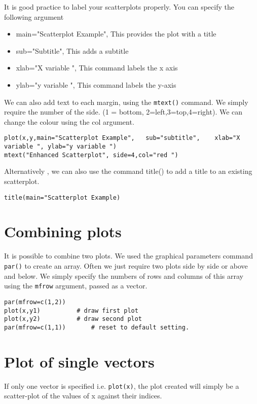 It is good practice to label your scatterplots properly. You can specify the following argument
\begin{itemize}
	\item	main="Scatterplot Example", 	This provides the plot with a title
	\item	sub="Subtitle",                 This adds a subtitle
	\item	xlab="X variable ",				This command labels the x axis 
	\item   ylab="y variable ",				This command labels the y-axis
\end{itemize}
We can also add text to each margin, using the \texttt{mtext()} command.  
We simply require the number of the side. (1 = bottom, 2=left,3=top,4=right). 
We can change the colour using the col argument.
\footnotesize \begin{verbatim}
plot(x,y,main="Scatterplot Example",   sub="subtitle",    xlab="X variable ", ylab="y variable ")	
mtext("Enhanced Scatterplot", side=4,col="red ")
\end{verbatim}\normalsize
Alternatively , we can also use the command title() to add a title to an existing scatterplot.
\footnotesize \begin{verbatim}
title(main="Scatterplot Example)	
\end{verbatim}\normalsize


\section{Combining plots}
It is possible to combine two plots. We used the graphical parameters command \texttt{par()} to create an array. 
Often we just require two plots side by side or above and below. We simply specify the numbers of rows and columns of this array using the \texttt{mfrow} argument, passed as a vector.

\begin{verbatim}
par(mfrow=c(1,2))
plot(x,y1)			# draw first plot
plot(x,y2)			# draw second plot
par(mfrow=c(1,1))		# reset to default setting.
\end{verbatim}

\section{Plot of single vectors}
If only one vector is specified i.e. \texttt{plot(x)},  the plot created will simply be a scatter-plot of the values of x against their indices.

